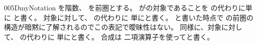 \documentclass[index]{subfiles}
\begin{document}
\begin{myBlock}{005D}{myNotation}
  を階数、
  を前圏とする。
  がの対象であることを
  の代わりに単に
  と書く。
  対象に対して、
  の代わりに
  単にと書く。
  と書いた時点で
  の前圏の構造が暗黙に了解されるのでこの表記で曖昧性はない。
  同様に、対象に対して、
  の代わりに
  単にと書く。
  合成は
  二項演算子を使ってと書く。
\end{myBlock}
\end{document}
